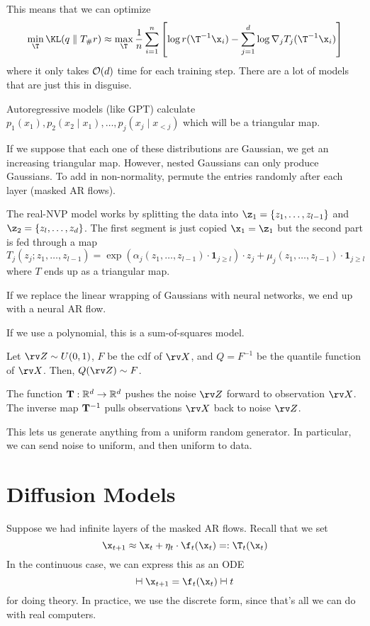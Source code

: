 \documentclass[class=cs480,notes,tikz]{agony}
\begin{document}
This means that we can optimize
\[
  \min_{\T} \KL(q \parallel T_\#r) \approx
  \max_{\T} \frac1n\sum_{i=1}^n\qty[\log r(\T^{-1}\x_i) - \sum_{j=1}^d\log\nabla_jT_j(\T^{-1}\x_i)]
\]
where it only takes $\order{d}$ time for each training step.
There are a lot of models that are just this in disguise.

Autoregressive models (like GPT) calculate
$p_1(x_1), p_2(x_2 \mid x_1), \dotsc, p_j(x_j \mid x_{<j})$
which will be a triangular map.

If we suppose that each one of these distributions are Gaussian,
we get an increasing triangular map.
However, nested Gaussians can only produce Gaussians.
To add in non-normality, permute the entries randomly after each layer (masked AR flows).

The real-NVP model works by splitting the data into $\z_1=\{z_1,\dotsc,z_{l-1}\}$
and $\z_2 = \{z_l,\dots,z_d\}$.
The first segment is just copied $\x_1 = \z_1$
but the second part is fed through a map
\[
  T_j(z_j; z_1,\dotsc,z_{l-1}) = \exp(\alpha_j(z_1,\dotsc,z_{l-1})\cdot\symbf1_{j\geq l}) \cdot z_j + \mu_j(z_1,\dotsc,z_{l-1})\cdot\symbf1_{j\geq l}
\]
where $T$ ends up as a triangular map.

If we replace the linear wrapping of Gaussians with neural networks,
we end up with a neural AR flow.

If we use a polynomial, this is a sum-of-squares model.

\begin{theorem}
  Let $\rv Z \sim U(0,1)$, $F$ be the cdf of $\rv X$, and $Q = F^{-1}$ be the quantile function of $\rv X$.
  Then, $Q(\rv Z) \sim F$.
\end{theorem}

The function $\vb T : \mathbb{R}^d \to \mathbb{R}^d$ pushes the noise $\rv Z$ forward to observation $\rv X$.
The inverse map $\vb T^{-1}$ pulls observations $\rv X$ back to noise $\rv Z$.

This lets us generate anything from a uniform random generator.
In particular, we can send noise to uniform, and then uniform to data.

\section{Diffusion Models}

Suppose we had infinite layers of the masked AR flows. Recall that we set
\[
  \x_{t+1} \approx \x_t + \eta_t \cdot \f_t(\x_t) =: \T_t(\x_t)
\]
In the continuous case, we can express this as an ODE
\[ \dd{\x_{t+1}} = \f_t(\x_t)\dd{t} \]
for doing theory. In practice, we use the discrete form,
since that's all we can do with real computers.
\end{document}
